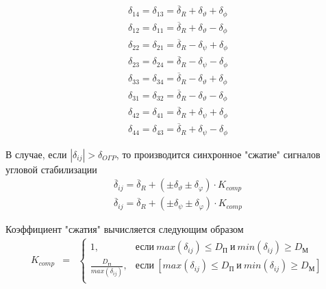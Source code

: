 \begin{equation}
	\begin{gathered}
		\delta_{14} = \delta_{13} = \overline{\delta}_R + \delta_\vartheta + \delta_\phi \\
		\delta_{12} = \delta_{11} = \overline{\delta}_R + \delta_\vartheta - \delta_\phi \\
		\delta_{22} = \delta_{21} = \overline{\delta}_R - \delta_\psi + \delta_\phi \\
		\delta_{23} = \delta_{24} = \overline{\delta}_R - \delta_\psi - \delta_\phi \\
		\delta_{33} = \delta_{34} = \overline{\delta}_R - \delta_\vartheta + \delta_\phi \\
		\delta_{31} = \delta_{32} = \overline{\delta}_R - \delta_\vartheta - \delta_\phi \\
		\delta_{42} = \delta_{41} = \overline{\delta}_R + \delta_\psi + \delta_\phi \\
		\delta_{44} = \delta_{43} = \overline{\delta}_R + \delta_\psi - \delta_\phi 
	\end{gathered}
\end{equation}

В случае, если $|\delta_{ij}| > \delta_{O\Gamma P}$, то производится синхронное "сжатие" сигналов угловой стабилизации
\begin{equation}
	\begin{gathered}
		\overline{\delta}_{ij} = \overline{\delta}_R + \left( \pm \delta_{\vartheta} \pm \delta_{\varphi} \right) \cdot K_{comp} \\
		\overline{\delta}_{ij} = \overline{\delta}_R + \left( \pm \delta_{\psi} \pm \delta_{\varphi} \right) \cdot K_{comp}
	\end{gathered}
\end{equation}

Коэффициент "сжатия" вычисляется следующим образом
\begin{equation}
	\begin{matrix}
			K_{comp} & = & \left\{ \begin{matrix}
				1, & \text{если} \  max(\delta_{ij}) \leq D_{\text{П}} \  \text{и} \  min(\delta_{ij}) \geq D_\text{М} \\
				\frac{D_\text{П}}{max(\delta_{ij})}, &  \text{если} \  \left[max(\delta_{ij}) \leq D_{\text{П}} \  \text{и} \  min(\delta_{ij}) \geq D_\text{М} \right] \\
			\end{matrix}\right.
	\end{matrix} 
\end{equation}

\clearpage
